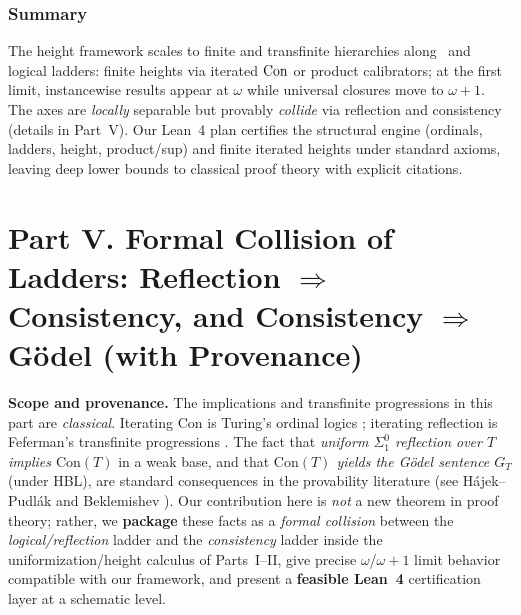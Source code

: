\documentclass[11pt]{article}
\theoremstyle{definition}
\theoremstyle{remark}
\begin{document}
\section{Summary}

The height framework scales to finite and transfinite hierarchies along \LCons\ and logical ladders:
finite heights via iterated $\Con$ or product calibrators; at the first limit, instancewise results appear at $\omega$ while universal closures move to $\omega{+}1$. The axes are \emph{locally} separable but provably \emph{collide} via reflection and consistency (details in Part~V). Our Lean~4 plan certifies the structural engine (ordinals, ladders, height, product/sup) and finite iterated heights under standard axioms, leaving deep lower bounds to classical proof theory with explicit citations.


\part*{Part V. Formal Collision of Ladders: Reflection \texorpdfstring{$\Rightarrow$}{=>} Consistency, and Consistency \texorpdfstring{$\Rightarrow$}{=>} G\"odel (with Provenance)}

\providecommand{\EA}{\mathrm{EA}}
\providecommand{\ISigmaOne}{\mathrm{I}\Sigma_1}
\providecommand{\RFNSigOne}{\mathrm{RFN}_{\Sigma^0_1}}
\providecommand{\Con}{\mathrm{Con}}
\providecommand{\HA}{\mathrm{HA}}
\providecommand{\PA}{\mathrm{PA}}

\begin{mdframed}[style=status]
\textbf{Scope and provenance.}
The implications and transfinite progressions in this part are \emph{classical}.
Iterating $\Con$ is Turing’s ordinal logics \cite{Turing1939}; iterating reflection is Feferman’s
transfinite progressions \cite{Feferman1962}. The fact that \emph{uniform $\Sigma^0_1$ reflection over $T$ implies $\Con(T)$} in a weak base,
and that \emph{$\Con(T)$ yields the G\"odel sentence $G_T$} (under HBL),
are standard consequences in the provability literature (see H\'ajek--Pudl\'ak \cite{HajekPudlak}
and Beklemishev \cite{Beklemishev2003,Beklemishev2004}). Our contribution here is \emph{not} a new theorem
in proof theory; rather, we \textbf{package} these facts as a \emph{formal collision} between the
\emph{logical/reflection} ladder and the \emph{consistency} ladder inside the uniformization/height calculus of Parts~I–II,
give precise \(\omega\)/\(\omega{+}1\) limit behavior compatible with our framework,
and present a \textbf{feasible Lean~4} certification layer at a schematic level.
\end{mdframed}
\end{document}

